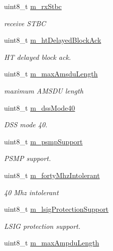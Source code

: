 \begin{DoxyCompactItemize}
uint8\+\_\+t \hyperlink{classns3_1_1HtCapabilities_afbb81f7ce7b03ece031333142eb68bdd}{m\+\_\+rx\+Stbc}
\begin{DoxyCompactList}\small\item\em receive S\+T\+BC \end{DoxyCompactList}\item 
uint8\+\_\+t \hyperlink{classns3_1_1HtCapabilities_a639f078faf090e289af27bdf9a127eba}{m\+\_\+ht\+Delayed\+Block\+Ack}
\begin{DoxyCompactList}\small\item\em HT delayed block ack. \end{DoxyCompactList}\item 
uint8\+\_\+t \hyperlink{classns3_1_1HtCapabilities_a60661663c552a1993f59db61e003b9aa}{m\+\_\+max\+Amsdu\+Length}
\begin{DoxyCompactList}\small\item\em maximum A\+M\+S\+DU length \end{DoxyCompactList}\item 
uint8\+\_\+t \hyperlink{classns3_1_1HtCapabilities_a4c9abdb8fd14200504265569ca0d9a63}{m\+\_\+dss\+Mode40}
\begin{DoxyCompactList}\small\item\em D\+SS mode 40. \end{DoxyCompactList}\item 
uint8\+\_\+t \hyperlink{classns3_1_1HtCapabilities_af0a8b984d6bd723aa9e51f00ac609b1a}{m\+\_\+psmp\+Support}
\begin{DoxyCompactList}\small\item\em P\+S\+MP support. \end{DoxyCompactList}\item 
uint8\+\_\+t \hyperlink{classns3_1_1HtCapabilities_ab3b109b4deb20db9c7b81d77d924e2d7}{m\+\_\+forty\+Mhz\+Intolerant}
\begin{DoxyCompactList}\small\item\em 40 Mhz intolerant \end{DoxyCompactList}\item 
uint8\+\_\+t \hyperlink{classns3_1_1HtCapabilities_a87f51e202fa1a361ad2ec4b31da894e1}{m\+\_\+lsig\+Protection\+Support}
\begin{DoxyCompactList}\small\item\em L\+S\+IG protection support. \end{DoxyCompactList}\item 
uint8\+\_\+t \hyperlink{classns3_1_1HtCapabilities_aed935a36c6f0ca2fc2a17ef316f62c81}{m\+\_\+max\+Ampdu\+Length}

\end{DoxyCompactItemize}

